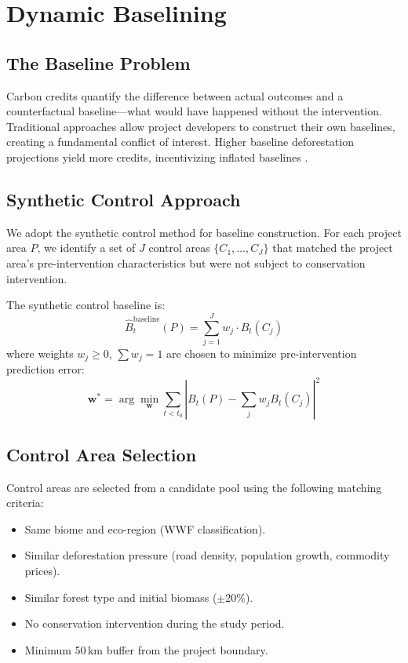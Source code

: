 \documentclass[11pt,a4paper]{article}
\begin{document}
\section{Dynamic Baselining}
\label{sec:baselines}

\subsection{The Baseline Problem}

Carbon credits quantify the difference between actual outcomes and a
counterfactual baseline---what would have happened without the
intervention. Traditional approaches allow project developers to
construct their own baselines, creating a fundamental conflict of
interest. Higher baseline deforestation projections yield more credits,
incentivizing inflated baselines \citep{west2023action}.

\subsection{Synthetic Control Approach}

We adopt the synthetic control method \citep{abadie2010synthetic} for
baseline construction. For each project area $P$, we identify a set of
$J$ control areas $\{C_1, \ldots, C_J\}$ that matched the project area's
pre-intervention characteristics but were not subject to conservation
intervention.

The synthetic control baseline is:
\begin{equation}
  \hat{B}_t^{\text{baseline}}(P) = \sum_{j=1}^{J} w_j \cdot B_t(C_j)
\end{equation}
where weights $w_j \geq 0$, $\sum w_j = 1$ are chosen to minimize
pre-intervention prediction error:
\begin{equation}
  \mathbf{w}^* = \arg\min_{\mathbf{w}} \sum_{t < t_0}
  \left| B_t(P) - \sum_j w_j B_t(C_j) \right|^2
\end{equation}

\subsection{Control Area Selection}

Control areas are selected from a candidate pool using the following
matching criteria:
\begin{itemize}
  \item Same biome and eco-region (WWF classification).
  \item Similar deforestation pressure (road density, population growth,
    commodity prices).
  \item Similar forest type and initial biomass ($\pm$20\%).
  \item No conservation intervention during the study period.
  \item Minimum 50\,km buffer from the project boundary.
\end{itemize}
\end{document}
